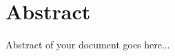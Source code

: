% 
%
%
% 




\chapter*{Abstract}
Abstract of your document goes here...
\newpage
\tableofcontents
\listoffigures
\listoftables
\listofsymbols 

\newpage
{}

%

%
%

 
